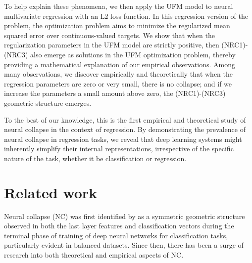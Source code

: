 \documentclass{article}
\theoremstyle{plain}
\theoremstyle{definition}
\theoremstyle{remark}
\begin{document}
To help explain these phenomena, we then apply the UFM model to neural multivariate regression with an L2 loss function. In this regression version of the problem, the optimization problem aims to minimize the regularized mean squared error over continuous-valued targets. 
We show that when the regularization parameters in the UFM model are strictly positive, then (NRC1)-(NRC3) also emerge as solutions in the UFM optimization problem,
thereby providing a mathematical explanation of our empirical observations. Among many observations, we discover empirically and theoretically that when the regression parameters are zero or very small, there is no collapse; and if we increase the parameters a small amount above zero, the (NRC1)-(NRC3) geometric structure emerges. 

To the best of our knowledge, this is the first empirical and theoretical study of neural collapse in the context of regression. 
By demonstrating the prevalence of neural collapse in regression tasks, we reveal that deep learning systems might inherently simplify their internal representations, irrespective of the specific nature of the task, whether it be classification or regression. 





\section{Related work}

Neural collapse (NC) was first identified by \cite{papyan2020prevalence} as a symmetric geometric structure observed in both the last layer features and classification vectors during the terminal phase of training of deep neural networks for classification tasks, particularly evident in balanced datasets. Since then, there has been a surge of research into both theoretical and empirical aspects of NC.
\end{document}
